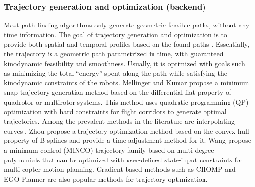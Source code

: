 \documentclass[letterpaper,journal,twoside]{IEEEtran}
\begin{document}
\subsubsection{Trajectory generation and optimization (backend)}
Most path-finding algorithms only generate geometric 
feasible paths, without any time information. 
The goal of trajectory generation and optimization is to 
provide both spatial and temporal profiles based on the 
found paths \cite{quan2020survey}. 
Essentially, the trajectory is a geometric path parametrized 
in time, with guaranteed kinodynamic feasibility and smoothness.
Usually, it is optimized with goals such as minimizing the 
total ``energy'' spent along the path while satisfying the 
kinodynamic constraints of the robots.
Mellinger and Kumar \cite{mellinger2011minimum} propose 
a minimum snap trajectory generation method based on the 
differential flat property of quadrotor or multirotor 
systems. 
This method uses quadratic-programming (QP) optimization with 
hard constraints for flight corridors to generate optimal 
trajectories. 
Among the prevalent methods in the literature are 
interpolating curves \cite{dong2023review}.
Zhou \etal \cite{zhou2019robust} propose a trajectory 
optimization method based on the convex hull property of 
B-splines and provide a time adjustment method for it.
Wang \etal \cite{wang2022geometrically} propose a 
minimum-control (MINCO) trajectory family based on 
multi-degree polynomials that can be 
optimized with user-defined state-input constraints for 
multi-copter motion planning.
Gradient-based methods such as
CHOMP \cite{ratliff2009chomp} and 
EGO-Planner \cite{zhou2020ego} are also popular methods 
for trajectory optimization.
\end{document}
